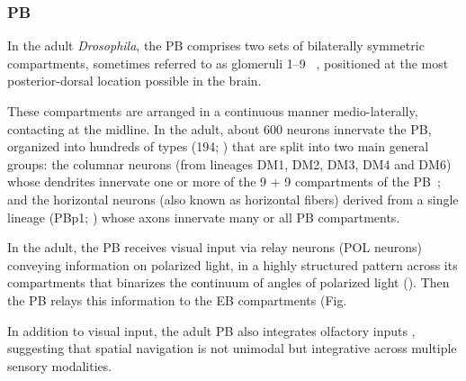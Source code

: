 
    
        \subsubsection{PB}
        In the adult \textit{Drosophila}, the PB comprises two sets of bilaterally symmetric compartments, sometimes referred to as glomeruli 1–9 ~\cite{hulse2021connectome}, positioned at the most posterior-dorsal location possible in the brain.

        These compartments are arranged in a continuous manner medio-laterally, contacting at the midline. In the adult, about 600 neurons innervate the PB, organized into hundreds of types (194; \citep{wolff2015neuroarchitecture}) that are split into two main general groups: the columnar neurons (from lineages DM1, DM2, DM3, DM4 and DM6) whose dendrites innervate one or more of the 9 + 9 compartments of the PB~\citep{wolff2015neuroarchitecture}; and the horizontal neurons (also known as horizontal fibers) derived from a single lineage (PBp1; \citep{andrade2019developmentally}) whose axons innervate many or all PB compartments.

        In the adult, the PB receives visual input via relay neurons (POL neurons) conveying information on polarized light, in a highly structured pattern across its compartments that binarizes the continuum of angles of polarized light (\citep{heinze2009transformation}). Then the PB relays this information to the EB compartments (Fig. %

        In addition to visual input, the adult PB also integrates olfactory inputs \citep{hulse2021connectome}, suggesting that spatial navigation is not unimodal but integrative across multiple sensory modalities.
